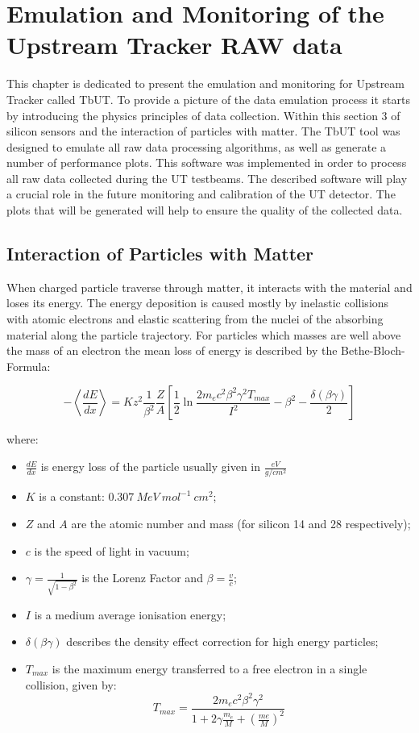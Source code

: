 \chapter{Emulation and Monitoring of the Upstream Tracker RAW data}
This chapter is dedicated to present the emulation and monitoring for Upstream Tracker called TbUT.
To provide a picture of the data emulation process it starts by introducing the physics principles of data collection. Within this section 3 of silicon sensors and the interaction of particles with matter.   
The TbUT tool was designed to emulate all raw data processing algorithms, as well as generate a number of performance plots. This software was implemented in order to process all raw data collected during the UT testbeams. The described software will play a crucial role in the future monitoring and calibration of the UT detector. The plots that will be generated will help to ensure the quality of the collected data. 


\section{Interaction of Particles with Matter}
\label{sec:Interaction}
When charged particle traverse through matter, it interacts with the material and loses its energy. The energy deposition is caused mostly by inelastic collisions with atomic electrons and elastic scattering from the nuclei of the absorbing material along the particle trajectory. For particles which masses are well above the mass of an electron the mean loss of energy is described by the Bethe-Bloch-Formula: 

\begin{equation}
\label{eq:Bethe_bloh}
  -\left< \frac{dE}{dx} \right> = K z^2 \frac{1}{\beta^2} \frac{Z}{A} 
  \left[ \frac{1}{2} \ln \frac{2m_e c^2 \beta^2 \gamma^2 T_{max}}{I^2} - \beta^2 - \frac{\delta(\beta \gamma)}{2}
  \right]  
\end{equation}

where: 
\begin{itemize}
    \item $\frac{dE}{dx}$ is energy loss of the particle usually given in $\frac{eV}{g/cm^{2}}$
    \item $K$ is a constant: $0.307~ MeV~ mol^{-1}~ cm^2$;
    \item $Z$ and $A$ are the atomic number and mass (for silicon 14 and 28 respectively);
    \item $c$ is the speed of light in vacuum;
    \item $\gamma = \frac{1}{\sqrt{1-\beta^2}}$ is the Lorenz Factor and $\beta = \frac{v}{c}$;
    \item $I$ is a medium average ionisation energy;
    \item $\delta(\beta \gamma)$ describes the density effect correction for high energy particles; 
    \item $T_{max}$ is the maximum energy transferred to a free electron in a single collision, given by:
    \begin{equation}
        T_{max} = \frac{2m_e c^2 \beta^2 \gamma^2}{1+2\gamma \frac{m_e}{M}+ (\frac{me}{M})^2}
    \end{equation}
\end{itemize}

